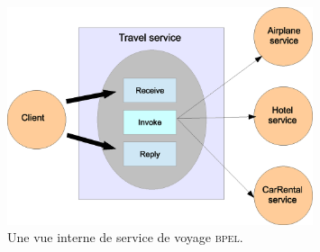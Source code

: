 \begin{figure}[h]
    \centering
    \includegraphics[width=0.8\textwidth]{figs/bpel-travel-example-shema.eps}
    \caption{Une vue interne de service de voyage \textsc{bpel}.}
    \label{fig:3w_to_sws}
\end{figure}
